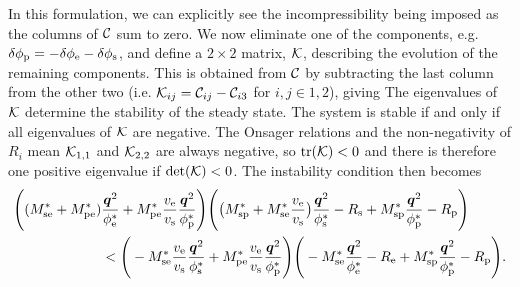In this formulation, we can explicitly see the incompressibility being imposed as the columns of $\cal C$ sum to zero.
We now eliminate one of the components, e.g. $\delta\phi_{\mathrm{p}} = -\delta\phi_{\mathrm{e}} - \delta\phi_{\mathrm{s}}$, and define a $2\times2$ matrix, $\cal K$, describing the evolution of the remaining components. This is obtained from $\cal C$ by subtracting the last column from the other two (i.e. ${\cal K}_{ij} = {\cal C}_{ij} - {\cal C}_{i3}$ for $i, j \in {1, 2}$), giving
\newline
\noindent
{}
The eigenvalues of ${\cal K}$ determine the stability of the steady state. The system is stable if and only if all eigenvalues of ${\cal K}$ are negative. The Onsager relations and the non-negativity of $R_i$ mean ${\cal K}_{1,1}$ and ${\cal K}_{2,2}$ are always negative, so $\text{tr}({\cal K}) < 0$ and there is therefore one positive eigenvalue if $\det({\cal K})<0$. The instability condition then becomes
\begin{equation}
\begin{split}
    \Bigg((M_{\mathrm{se}}^*+M_{\mathrm{pe}}^*)&\frac{\bm{q}^2}{\phi_{\mathrm{e}}^*} + M_{\mathrm{pe}}^*\frac{v_{\mathrm{e}}}{v_{\mathrm{s}}}\frac{\bm{q}^2}{\phi_{\mathrm{p}}^*}\Bigg)\Bigg(\big(M_{\mathrm{sp}}^* + M_{\mathrm{se}}^*\frac{v_{\mathrm{e}}}{v_{\mathrm{s}}}\big)\frac{\bm{q}^2}{\phi_{\mathrm{s}}^*} - R_\mathrm{s}  + M_{\mathrm{sp}}^*\frac{\bm{q}^2}{\phi_{\mathrm{p}}^*} - R_\mathrm{p} \Bigg) \\
    &< \Bigg(-M_{\mathrm{se}}^*\frac{v_{\mathrm{e}}}{v_{\mathrm{s}}}\frac{\bm{q}^2}{\phi_{\mathrm{s}}^*} + M_{\mathrm{pe}}^*\frac{v_{\mathrm{e}}}{v_{\mathrm{s}}}\frac{\bm{q}^2}{\phi_{\mathrm{p}}^*}\Bigg)\Bigg(-M_{\mathrm{se}}^*\frac{\bm{q}^2}{\phi_{\mathrm{e}}^*} - R_\mathrm{e}  + M_{\mathrm{sp}}^*\frac{\bm{q}^2}{\phi_{\mathrm{p}}^*} - R_\mathrm{p} \Bigg).
\end{split}
\label{hi_ord_ins}
\end{equation}
